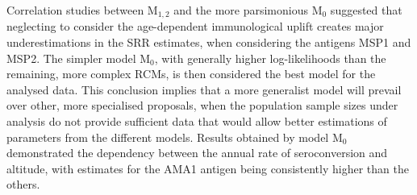 Correlation studies between M$_{1,2}$ and the more parsimonious M$_0$ suggested that neglecting to consider the age-dependent immunological uplift creates major underestimations in the SRR estimates, when considering the antigens MSP1 and MSP2.
The simpler model M$_0$, with generally higher log-likelihoods than the remaining, more complex RCMs, is then considered the best model for the analysed data.
This conclusion implies that a more generalist model will prevail over other, more specialised proposals, when the population sample sizes under analysis do not provide sufficient data that would allow better estimations of parameters from the different models.
Results obtained by model M$_0$ demonstrated the dependency between the annual rate of seroconversion and altitude, with estimates for the AMA1 antigen being consistently higher than the others.

